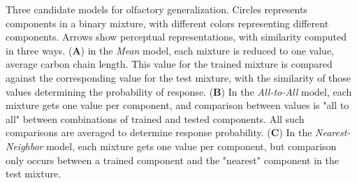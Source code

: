 \label{fig:cartoon}
Three candidate models for olfactory generalization.  Circles represents components in a binary mixture, with different colors representing different components.  Arrows show perceptual representations, with similarity computed in three ways. (\textbf{A}) in the \textit{Mean} model, each mixture is reduced to one value, average carbon chain length.  This value for the trained mixture is compared against the corresponding value for the test mixture, with the similarity of those values determining the probability of response. (\textbf{B}) In the \textit{All-to-All} model, each mixture gets one value per component, and comparison between values is "all to all" between combinations of trained and tested components.  All such comparisons are averaged to determine response probability. (\textbf{C}) In the \textit{Nearest-Neighbor} model, each mixture gets one value per component, but comparison only occurs between a trained component and the "nearest" component in the test mixture.  